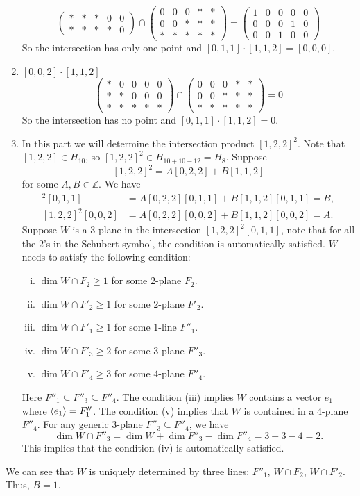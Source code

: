 \documentclass[letterpaper, 12pt]{article}
\begin{document}
\begin{solution}
\begin{enumerate}[(1)]
\[\begin{pmatrix}
   *&*&*&0&0\\
   *&*&*&*&0
\end{pmatrix}\cap \begin{pmatrix}
   0&0&0&*&*\\
   0&0&*&*&*\\ 
   *&*&*&*&*
\end{pmatrix}=\begin{pmatrix}
   1&0&0&0&0\\ 
   0&0&0&1&0\\ 
   0&0&1&0&0
\end{pmatrix}\]
So the intersection has only one point and \([0,1,1]\cdot [1,1,2]=[0,0,0]\).
\item \([0,0,2]\cdot [1,1,2]\)
\[\begin{pmatrix}
   *&0&0&0&0\\ 
   *&*&0&0&0\\
   *&*&*&*&*
\end{pmatrix}\cap \begin{pmatrix}
   0&0&0&*&*\\
   0&0&*&*&*\\ 
   *&*&*&*&*
\end{pmatrix}=0\]
So the intersection has no point and \([0,1,1]\cdot [1,1,2]=0\).
\item In this part we will determine the intersection product \([1,2,2]^2\). Note that \([1,2,2]\in H_{10}\), so \([1,2,2]^2\in H_{10+10-12}=H_8\). Suppose 
\[[1,2,2]^2=A[0,2,2]+B[1,1,2]\]
for some \(A,B\in \mathbb{Z}\). We have 
\begin{align*}
    [1,2,2]^2[0,1,1]&=A[0,2,2][0,1,1]+B[1,1,2][0,1,1]=B,\\ 
    [1,2,2]^2[0,0,2]&=A[0,2,2][0,0,2]+B[1,1,2][0,0,2]=A.
\end{align*}
Suppose \(W\) is a \(3\)-plane in the intersection \([1,2,2]^2[0,1,1]\), note that for all the \(2\)'s in the Schubert symbol, the condition is automatically satisfied. \(W\) needs to satisfy the following condition:
\begin{enumerate}[(i)]
\item \(\dim W\cap F_2\geq 1\) for some \(2\)-plane \(F_2\). 
\item \(\dim W\cap F'_2\geq 1\) for some \(2\)-plane \(F'_2\).
\item \(\dim W\cap F'_1\geq 1\) for some \(1\)-line \(F''_1\).
\item \(\dim W\cap F'_3\geq 2\) for some \(3\)-plane \(F''_3\).
\item \(\dim W\cap F'_4\geq 3\) for some \(4\)-plane \(F''_4\).
\end{enumerate}
Here \(F''_1\subseteq F''_3\subseteq F''_4\). The condition (iii) implies \(W\) contains a vector \(e_1\) where \(\langle e_1\rangle=F''_1\).  The condition (v) implies that \(W\) is contained in a \(4\)-plane \(F''_4\). For any generic \(3\)-plane \(F''_3\subseteq F''_4\), we have 
\[\dim W\cap F''_3=\dim W+\dim F''_3-\dim F''_4=3+3-4=2.\]
This implies that the condition (iv) is automatically satisfied. 
\end{enumerate}
We can see that \(W\) is uniquely determined by three lines: \(F''_1\), \(W\cap F_2\), \(W\cap F'_2\). Thus, \(B=1\). 


\end{solution}
\end{document}
